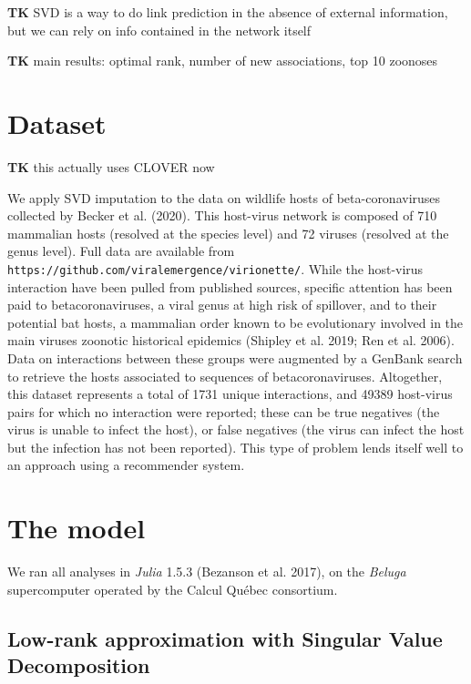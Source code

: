 \documentclass[10pt,oneside]{article}
\begin{document}
\textbf{TK} SVD is a way to do link prediction in the absence of
external information, but we can rely on info contained in the network
itself

\textbf{TK} main results: optimal rank, number of new associations, top
10 zoonoses

\hypertarget{dataset}{%
\section{Dataset}\label{dataset}}

\textbf{TK} this actually uses CLOVER now

We apply SVD imputation to the data on wildlife hosts of
beta-coronaviruses collected by Becker et al. (2020). This host-virus
network is composed of 710 mammalian hosts (resolved at the species
level) and 72 viruses (resolved at the genus level). Full data are
available from \texttt{https://github.com/viralemergence/virionette/}.
While the host-virus interaction have been pulled from published
sources, specific attention has been paid to betacoronaviruses, a viral
genus at high risk of spillover, and to their potential bat hosts, a
mammalian order known to be evolutionary involved in the main viruses
zoonotic historical epidemics (Shipley et al. 2019; Ren et al. 2006).
Data on interactions between these groups were augmented by a GenBank
search to retrieve the hosts associated to sequences of
betacoronaviruses. Altogether, this dataset represents a total of 1731
unique interactions, and 49389 host-virus pairs for which no interaction
were reported; these can be true negatives (the virus is unable to
infect the host), or false negatives (the virus can infect the host but
the infection has not been reported). This type of problem lends itself
well to an approach using a recommender system.

\hypertarget{the-model}{%
\section{The model}\label{the-model}}

We ran all analyses in \emph{Julia} 1.5.3 (Bezanson et al. 2017), on the
\emph{Beluga} supercomputer operated by the Calcul Québec consortium.

\hypertarget{low-rank-approximation-with-singular-value-decomposition}{%
\subsection{Low-rank approximation with Singular Value
Decomposition}\label{low-rank-approximation-with-singular-value-decomposition}}
\end{document}

